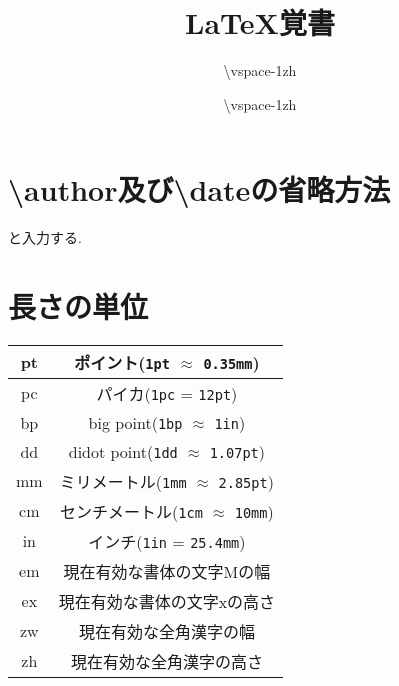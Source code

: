 \documentclass[12pt,uplatex]{jsarticle}
\title{\LaTeX 覚書}
\author{\vspace{-1zh}}\date{\vspace{-1zh}}
\begin{document}
\maketitle
\tableofcontents
\clearpage
\section{\textbackslash author及び\textbackslash dateの省略方法}
\begin{excode}
    \author{\textbackslash vspace{-1zh}}
    \date{\textbackslash vspace{-1zh}}
\end{excode}
と入力する.
\section{長さの単位}
\begin{table}[H]
	\centering
	\begin{tabular}{|c|c|} \hline
		pt & ポイント(\verb|1pt| $\approx$ \verb|0.35mm|) \\ \hline
		pc & パイカ(\verb|1pc| = \verb|12pt|) \\ \hline
		bp & big point(\verb|1bp| $\approx$ \verb|1in|) \\ \hline
		dd & didot point(\verb|1dd| $\approx$ \verb|1.07pt|) \\ \hline
		mm & ミリメートル(\verb|1mm| $\approx$ \verb|2.85pt|) \\ \hline
		cm & センチメートル(\verb|1cm| $\approx$ \verb|10mm|) \\ \hline
		in & インチ(\verb|1in| = \verb|25.4mm|) \\ \hline
		em & 現在有効な書体の文字Mの幅 \\ \hline
		ex & 現在有効な書体の文字xの高さ \\ \hline
		zw & 現在有効な全角漢字の幅 \\ \hline
		zh & 現在有効な全角漢字の高さ \\ \hline
	\end{tabular}
\end{table}
\end{document}
